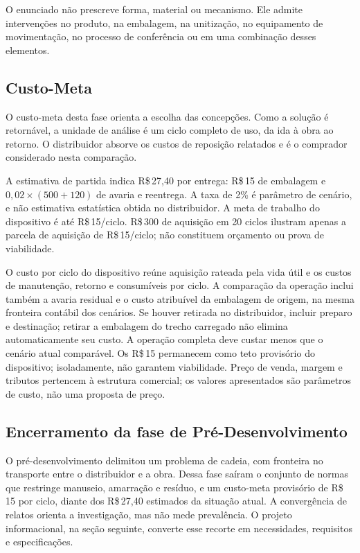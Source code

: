 O enunciado não prescreve forma, material ou mecanismo. Ele admite intervenções no produto, na embalagem, na unitização, no equipamento de movimentação, no processo de conferência ou em uma combinação desses elementos.

\subsection{Custo-Meta}

O custo-meta desta fase orienta a escolha das concepções. Como a solução é retornável, a unidade de análise é um ciclo completo de uso, da ida à obra ao retorno. O distribuidor absorve os custos de reposição relatados e é o comprador considerado nesta comparação.

A estimativa de partida indica R\$\,27,40 por entrega: R\$\,15 de embalagem e $0{,}02\times(500+120)$ de avaria e reentrega. A taxa de 2\% é parâmetro de cenário, e não estimativa estatística obtida no distribuidor. A meta de trabalho do dispositivo é até R\$\,15/ciclo. R\$\,300 de aquisição em 20 ciclos ilustram apenas a parcela de aquisição de R\$\,15/ciclo; não constituem orçamento ou prova de viabilidade.

O custo por ciclo do dispositivo reúne aquisição rateada pela vida útil e os custos de manutenção, retorno e consumíveis por ciclo. A comparação da operação inclui também a avaria residual e o custo atribuível da embalagem de origem, na mesma fronteira contábil dos cenários. Se houver retirada no distribuidor, incluir preparo e destinação; retirar a embalagem do trecho carregado não elimina automaticamente seu custo. A operação completa deve custar menos que o cenário atual comparável. Os R\$\,15 permanecem como teto provisório do dispositivo; isoladamente, não garantem viabilidade. Preço de venda, margem e tributos pertencem à estrutura comercial; os valores apresentados são parâmetros de custo, não uma proposta de preço.

\subsection{Encerramento da fase de Pré-Desenvolvimento}

O pré-desenvolvimento delimitou um problema de cadeia, com fronteira no transporte entre o distribuidor e a obra. Dessa fase saíram o conjunto de normas que restringe manuseio, amarração e resíduo, e um custo-meta provisório de R\$\,15 por ciclo, diante dos R\$\,27,40 estimados da situação atual. A convergência de relatos orienta a investigação, mas não mede prevalência. O projeto informacional, na seção seguinte, converte esse recorte em necessidades, requisitos e especificações.

